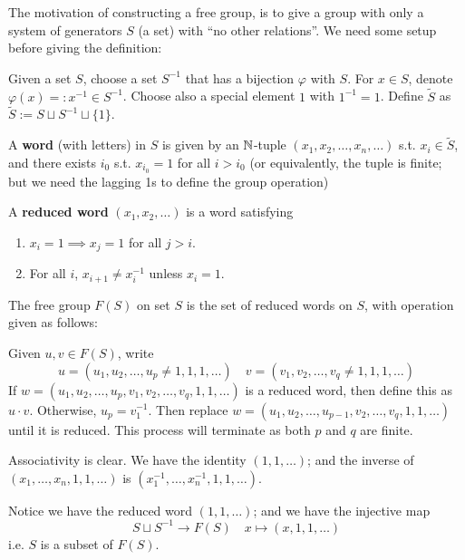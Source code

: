 \textstart
The motivation of constructing a free group, is to give a group with only a system of generators $S$ (a set) with ``no other relations''. We need some setup before giving the definition:

\begin{definition}[Word]
    Given a set $S$, choose a set $S^{-1}$ that has a bijection $\varphi$ with $S$. For $x \in S$, denote $\varphi(x) =: x^{-1} \in S^{-1}$. Choose also a special element $1$ with $1^{-1} = 1$. Define $\widetilde{S}$ as $\widetilde{S} := S \sqcup S^{-1} \sqcup \{1\}$.

    A \textbf{word} (with letters) in $S$ is given by an $\mathbb{N}$-tuple $(x_1, x_2, \dots, x_n, \dots)$ s.t. $x_i \in \widetilde{S}$, and there exists $i_0$ s.t. $x_{i_0} = 1$ for all $i > i_0$ (or equivalently, the tuple is finite; but we need the lagging 1s to define the group operation)
\end{definition}

\begin{definition}
    A \textbf{reduced word} $(x_1, x_2, \dots)$ is a word satisfying
    \begin{enumerate}[label=\arabic*)]
        \item $x_i = 1 \implies x_j = 1$ for all $j > i$.
        \item For all $i$, $x_{i+1} \neq x_i^{-1}$ unless $x_i = 1$.
    \end{enumerate}
\end{definition}

\begin{definition}
    The free group $F(S)$ on set $S$ is the set of reduced words on $S$, with operation given as follows:

    Given $u, v \in F(S)$, write
    \[
        u = (u_1, u_2, \dots, u_p \neq 1, 1, 1, \dots) \quad v = (v_1, v_2, \dots, v_q \neq 1, 1, 1, \dots)
    \]
    If $w = (u_1, u_2, \dots, u_p, v_1, v_2, \dots, v_q, 1, 1, \dots)$ is a reduced word, then define this as $u \cdot v$. Otherwise, $u_p = v_1^{-1}$. Then replace $w = (u_1, u_2, \dots, u_{p-1}, v_2, \dots, v_q, 1, 1, \dots)$ until it is reduced. This process will terminate as both $p$ and $q$ are finite.

    Associativity is clear. We have the identity $(1, 1, \dots)$; and the inverse of $(x_1, \dots, x_n, 1, 1, \dots)$ is $(x_1^{-1}, \dots, x_n^{-1}, 1, 1, \dots)$.
\end{definition}

\textstart
Notice we have the reduced word $(1, 1, \dots)$; and we have the injective map
\[
    S \sqcup S^{-1} \to F(S) \quad x \mapsto (x, 1, 1, \dots)
\]
i.e. $S$ is a subset of $F(S)$.

